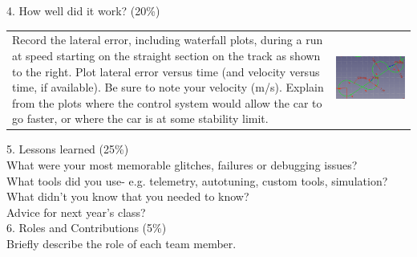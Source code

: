 \documentclass[11pt]{article}
\begin{document}
4.  How well did it work? (20\%)\\
\begin{tabular}{lr}
\parbox[b]{3.5in}{Record the lateral error, including waterfall plots,
during a run at speed starting on the straight section on the
track as shown to the right. Plot lateral error
versus time (and velocity versus time, if available). 
Be sure to note your velocity (m/s).
Explain from the plots where 
the control system would allow the car to
go faster, or where the car is at some stability limit.}
~~ & \includegraphics[scale=0.4]{track_slalom.png}\\
\end{tabular}
\vspace{0.1in}

5. Lessons learned (25\%)\\
What were your most memorable glitches, failures or debugging issues?\\
What tools did you use- e.g. telemetry, autotuning, custom tools, simulation?
What didn't you know that you needed to know?\\
Advice for next year's class?\\

6. Roles and Contributions (5\%)\\
Briefly describe the role of each team member.\\

\end{document}

